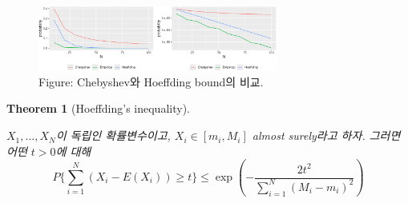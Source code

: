 \documentclass[
  13pt,
  letterpaper,
  DIV=11,
  numbers=noendperiod]{scrreprt}
\theoremstyle{plain}
\theoremstyle{definition}
\theoremstyle{definition}
\theoremstyle{plain}
\theoremstyle{definition}
\theoremstyle{plain}
\newtheorem{theorem}{Theorem}[chapter]
\theoremstyle{remark}
\begin{document}
\begin{figure}[th]

{\centering \includegraphics[width=0.7\textwidth,height=\textheight]{ineq_files/figure-pdf/unnamed-chunk-4-1.pdf}

}

\caption{Figure: Chebyshev와 Hoeffding bound의 비교.}

\end{figure}%

\begin{theorem}[Hoeffding's
inequality]\protect\hypertarget{thm-hoeffdingineq}{}\label{thm-hoeffdingineq}

\(X_1, \ldots, X_N\)이 독립인 확률변수이고, \(X_i \in [m_i, M_i]\)
almost surely라고 하자. 그러면 어떤 \(t>0\)에 대해 \[
P \{\sum_{i=1}^N (X_i - E(X_i))\geq t \} \leq \exp (- \frac{2t^2}{\sum_{i=1}^N (M_i - m_i)^2})
\]

\end{theorem}
\end{document}
